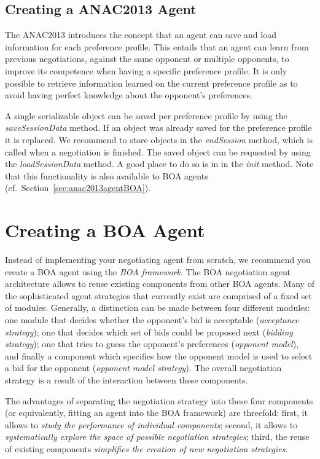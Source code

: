\documentclass[]{article}
\begin{document}
\subsection{Creating a ANAC2013 Agent}\label{sec:anac2013agent}
The ANAC2013 introduces the concept that an agent can save and load information for each preference profile. This entails that an agent can learn from previous negotiations, against the same opponent or multiple opponents, to improve its competence when having a specific preference profile. It is only possible to retrieve information learned on the current preference profile as to avoid having perfect knowledge about the opponent's preferences.

A single serializable object can be saved per preference profile by using the \textit{saveSessionData} method. If an object was already saved for the preference profile it is replaced. We recommend to store objects in the \textit{endSession} method, which is called when a negotiation is finished. The saved object can be requested by using the \textit{loadSessionData} method. A good place to do so is in in the \textit{init} method. Note that this functionality is also available to BOA agents (cf.\ Section~\ref{sec:anac2013agentBOA}).

\section{Creating a BOA Agent}\label{sec:boa}
Instead of implementing your negotiating agent from scratch, we recommend you create a BOA agent using the \textit{BOA framework}. The BOA negotiation agent architecture allows to reuse existing components from other BOA agents. Many of the sophisticated agent strategies that currently exist are comprised of a fixed set of modules. Generally, a distinction can be made between four different modules: one module that decides whether the opponent's bid is acceptable (\textit{acceptance strategy}); one that decides which set of bids could be proposed next (\textit{bidding strategy}); one that tries to guess the opponent's preferences (\textit{opponent model}), and finally a component which specifies how the opponent model is used to select a bid for the opponent (\textit{opponent model strategy}). The overall negotiation strategy is a result of the interaction between these components.

The advantages of separating the negotiation strategy into these four components (or equivalently, fitting an agent into the BOA framework) are threefold: first, it allows to \textit{study the performance of individual components}; second, it allows to \textit{systematically explore the space of possible negotiation strategies}; third, the reuse of existing components \textit{simplifies the creation of new negotiation strategies}.
\end{document}
